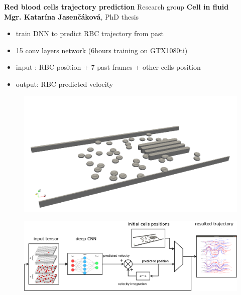 \documentclass[xcolor=dvipsnames]{beamer}
\begin{document}
\begin{frame}{\bf Red blood cells trajectory prediction}
Research group {\bf Cell in fluid} \\
{\bf Mgr. Katarína Jasenčáková}, PhD thesis

\begin{itemize}
  \item train DNN to predict RBC trajectory from past
  \item 15 conv layers network (6hours training on GTX1080ti)
  \item input : RBC position + 7 past frames + other cells position
  \item output: RBC predicted velocity
\end{itemize}

\begin{figure}
  \includegraphics[scale=0.08]{../../pictures/rbc_channel.png}
\end{figure}


\begin{figure}
  \includegraphics[scale=0.12]{../../diagrams/cells_prediction_velocity_integration.png}
\end{figure}


\end{frame}
\end{document}
